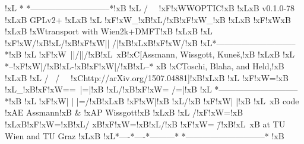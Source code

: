 !xL{}          *    *-----------------------------*!xB{}
!xL{}         / \    \ !xF{}!xW{}WOPTIC!xB{} !xL{}\!xB{} v0.1.0-78 !xL{}\!xB{} GPLv2+ !xL{}\!xB{}
!xL{}       !xF{}!xW{}_!xB{}!xL{}/!xB{}!xF{}!xW{}_!xB{}  !xL{}\!xB{} !xF{}!xW{}\!xB{}  !xL{}\!xB{} !xW{}transport with  Wien2k+DMFT!xB{} !xL{}\!xB{}
!xL{}      !xF{}!xW{}/!xB{}!xL{}/!xB{}!xF{}!xW{}|| /|!xB{}!xL{}\!xB{}!xF{}!xW{}/!xB{}   !xL{}*-----------------------------*!xB{}
!xL{}      !xF{}!xW{}\ ||/||/!xB{}!xL{}\    \!xB{}!xC{}[Assmann,  Wissgott,  Kuneš,!xB{} !xL{}\!xB{}
!xL{}     *--!xF{}!xW{}|/!xB{}!xL{}-!xB{}!xF{}!xW{}|/!xB{}!xL{}--*    \!xB{} !xC{}Toschi,  Blaha,  and  Held,!xB{} !xL{}\!xB{}
!xL{}    / \       / \    \ !xC{}http://arXiv.org/1507.04881]!xB{}!xL{}\!xB{}
!xL{}  !xF{}!xW{}=!xB{} !xL{}_!xB{}!xF{}!xW{}==\ |=|!xB{} !xL{}/!xB{}!xF{}!xW{}= /=|!xB{}  !xL{} *-----------------------------*!xB{}
!xL{} !xF{}!xW{}| | |=/!xB{}!xL{}\!xB{} !xF{}!xW{}|!xB{} !xL{}/!xB{} !xF{}!xW{}| |!xB{} !xL{}\    \!xB{} code !xA{}E Assmann!xB{} & !xA{}P Wissgott!xB{} !xL{}\!xB{}
!xL{} /!xF{}!xW{}=!xB{} !xL{}\!xB{}!xF{}!xW{}=!xB{}!xL{}/  \!xB{}!xF{}!xW{}=!xB{}!xL{}/!xB{}  !xF{}!xW{}= \=/!xB{}!xL{}\    \!xB{} at  TU  Wien  and  TU  Graz !xL{}\!xB{}
!xL{}*----*----*---------*    *-----------------------------*  !xB{}
